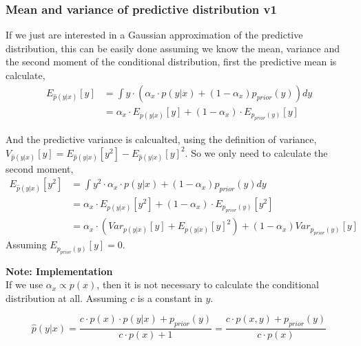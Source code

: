 \subsubsection{Mean and variance of predictive distribution v1}
If we just are interested in a Gaussian approximation of the predictive
distribution, this can be easily done assuming we know the mean, variance
and the second moment of the conditional distribution, first the predictive mean
is calculate, 
\begin{align*}
    E_{\hat p(y|x)}[y] &= \int y \cdot \left(\alpha_x \cdot p(y|x) + (1-\alpha_x) p_{prior}(y)\right) dy\\
    &= \alpha_x\cdot E_{p(y|x)}[y] + (1-\alpha_x)\cdot E_{p_{prior}(y)}[y]
\end{align*}

And the predictive variance is calcualted, using the definition of variance, $V_{\hat p(y|x)}[y] =
E_{\hat p(y|x)}[y^2] - E_{\hat p(y|x)}[y]^2$. So we only need to calculate the second moment, 
\begin{align*}
    E_{\hat p(y|x)}[y^2] &= \int y^2 \cdot \alpha_x \cdot p(y|x) + (1-\alpha_x) p_{prior}(y) dy\\
    &=\alpha_x \cdot E_{p(y|x)}[y^2] +(1-\alpha_x) \cdot E_{p_{prior}(y)}[y^2] \\
    &=\alpha_x \cdot(Var_{p(y|x)}[y]+E_{p(y|x)}[y]^2) + (1-\alpha_x) Var_{p_{prior}(y)}[y]
\end{align*}
Assuming $E_{p_{prior}(y)}[y] = 0$. 

\begin{tcolorbox}[
    sharp corners,
    boxrule=0mm,
    enhanced,
    borderline west={4pt}{0pt}{gray},
    colframe=drGray,
    colback=drGray,
    coltitle=black,
]
{\large \textbf{Note: Implementation}}\\
    If we use $\alpha_x \propto p(x)$, then it is not necessary to calculate the conditional
    distribution at all. Assuming $c$ is a constant in $y$. 

    $$\hat p(y|x) = \frac{c\cdot p(x)\cdot  p(y|x) + p_{prior}(y)}{c\cdot p(x)+1} = \frac{c \cdot p(x,y) + p_{prior}(y)}{c\cdot p(x)}$$
\end{tcolorbox}

